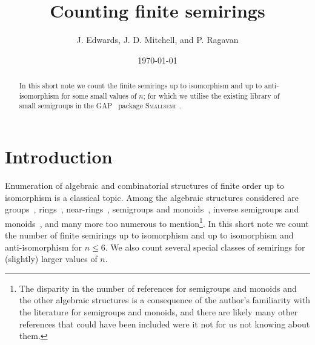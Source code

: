\documentclass{article}
\title{Counting finite semirings}
\author{J. Edwards, J. D. Mitchell, and P. Ragavan}
\date{\today}
\theoremstyle{definition}
\theoremstyle{plain}
\newcommand{\GAP}{\textsc{GAP}~\cite{GAP4}\xspace}
\newcommand{\Smallsemi}{\textsc{Smallsemi}~\cite{Smallsemi}\xspace}
\begin{document}
\maketitle

\begin{abstract}
  In this short note we count the finite semirings up to isomorphism
  and up to anti-isomorphism for some small values of $n$; for which we
  utilise the existing library of small semigroups in the \GAP
  package \Smallsemi.
\end{abstract}

\section{Introduction}

Enumeration of algebraic and combinatorial structures of finite order up to
isomorphism is a classical topic. Among the algebraic structures considered are
groups~\cite{BESCHE2002,A000001}, rings~\cite{Blackburn2022, Fine1993,
Kruse1970, A027623}, near-rings~\cite{Chow2024, SONATA, A305858},
semigroups and monoids~\cite{Distler2010, Distler2010, Distler2012, Distler2013,
  Forsythe1955, Grillet1996, Grillet2014, Jrgensen1977, Motzkin1955,
Plemmons1967, A027851, A058129, Satoh1994, A001426, A001423},
inverse semigroups and monoids~\cite{Malandro2019, A001428, A234843,
A234844, A234845}, and many more too numerous to mention\footnote{The disparity
  in the number of references for semigroups and monoids and the other
  algebraic structures is a consequence of the author's familiarity with the
  literature for semigroups and monoids, and there are likely many other
  references that could have been included were it not for us not knowing about
them.}. In this short note we count the number of finite semirings up to
isomorphism and up to isomorphism and anti-isomorphism for $n \leq 6$. We also
count several special classes of semirings for (slightly) larger values of $n$.
\end{document}
